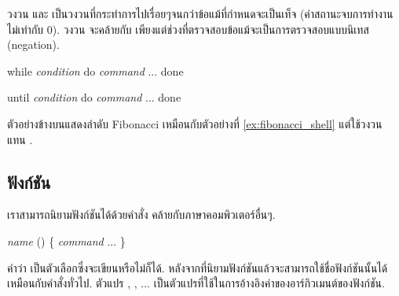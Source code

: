 \begin{thwbr}
\medskip
วงวน  และ  เป็นวงวนที่กระทำการไปเรื่อยๆจนกว่าข้อแม้ที่กำหนดจะเป็นเท็จ (ค่าสถานะจบการทำงานไม่เท่ากับ 0). วงวน  จะคล้ายกับ  เพียงแต่ช่วงที่ตรวจสอบข้อแม้จะเป็นการตรวจสอบแบบนิเทส (negation).
\begin{MyVerbatim}
while \textit{condition}
do
    \textit{command}
    ...
done
\end{MyVerbatim}
\begin{MyVerbatim}
until \textit{condition}
do
    \textit{command}
    ...
done
\end{MyVerbatim}
\begin{MyExample}
\end{MyExample}%
ตัวอย่างข้างบนแสดงลำดับ Fibonacci เหมือนกับตัวอย่างที่ \ref{ex:fibonacci_shell} แต่ใช้วงวน  แทน . 



\subsection{ฟังก์ชัน}
เราสามารถนิยามฟังก์ชันได้ด้วยคำสั่ง  คล้ายกับภาษาคอมพิวเตอร์อื่นๆ.
\begin{MyVerbatim}
[ function ] \textit{name} () \{
    \textit{command}
    ...
\}
\end{MyVerbatim}
คำว่า  เป็นตัวเลือกซึ่งจะเขียนหรือไม่ก็ได้. หลังจากที่นิยามฟังก์ชันแล้วจะสามารถใช้ชื่อฟังก์ชันนั้นได้เหมือนกับคำสั่งทั่วไป. ตัวแปร , , ... เป็นตัวแปรที่ใช้ในการอ้างอิงค่าของอาร์กิวเมนต์ของฟังก์ชัน. 


\end{thwbr}
